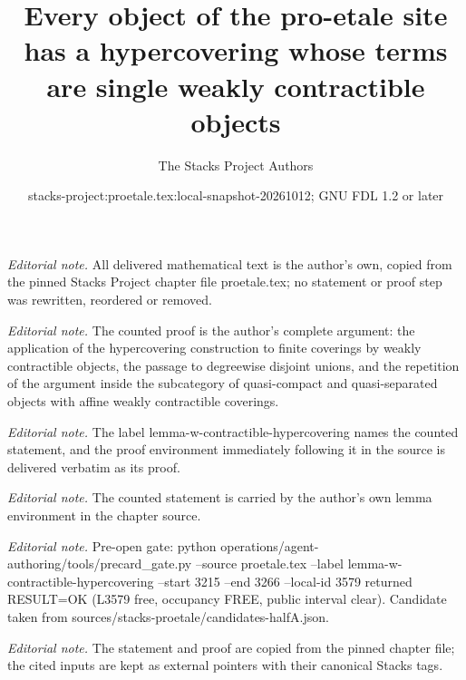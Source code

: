 \documentclass[10pt,a4paper]{amsart}
\title{Every object of the pro-etale site has a hypercovering whose terms are single weakly contractible objects}
\author{The Stacks Project Authors}
\date{stacks-project:proetale.tex:local-snapshot-20261012; GNU FDL 1.2 or later}
\theoremstyle{plain}
\theoremstyle{definition}
\theoremstyle{remark}
\numberwithin{equation}{subsection}
\begin{document}
\maketitle
\noindent\textit{Editorial note.} All delivered mathematical text is the author's own, copied from the pinned Stacks Project chapter file proetale.tex; no statement or proof step was rewritten, reordered or removed.\par\medskip
\noindent\textit{Editorial note.} The counted proof is the author's complete argument: the application of the hypercovering construction to finite coverings by weakly contractible objects, the passage to degreewise disjoint unions, and the repetition of the argument inside the subcategory of quasi-compact and quasi-separated objects with affine weakly contractible coverings.\par\medskip
\noindent\textit{Editorial note.} The label lemma-w-contractible-hypercovering names the counted statement, and the proof environment immediately following it in the source is delivered verbatim as its proof.\par\medskip
\noindent\textit{Editorial note.} The counted statement is carried by the author's own lemma environment in the chapter source.\par\medskip
\noindent\textit{Editorial note.} Pre-open gate: python operations/agent-authoring/tools/precard\_gate.py --source proetale.tex --label lemma-w-contractible-hypercovering --start 3215 --end 3266 --local-id 3579 returned RESULT=OK (L3579 free, occupancy FREE, public interval clear). Candidate taken from sources/stacks-proetale/candidates-halfA.json.\par\medskip
\noindent\textit{Editorial note.} The statement and proof are copied from the pinned chapter file; the cited inputs are kept as external pointers with their canonical Stacks tags.\par\medskip
\end{document}
